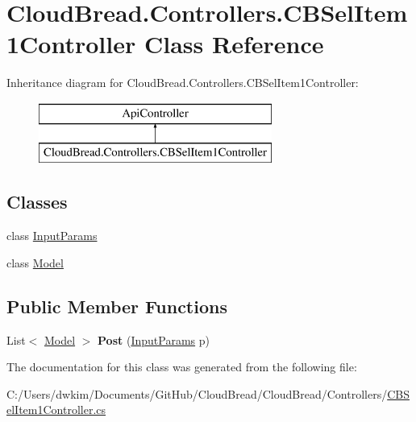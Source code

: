\hypertarget{a00048}{}\section{Cloud\+Bread.\+Controllers.\+C\+B\+Sel\+Item1\+Controller Class Reference}
\label{a00048}
Inheritance diagram for Cloud\+Bread.\+Controllers.\+C\+B\+Sel\+Item1\+Controller\+:\begin{figure}[H]
\begin{center}
\leavevmode
\includegraphics[height=2.000000cm]{a00048}
\end{center}
\end{figure}
\subsection*{Classes}
\begin{DoxyCompactItemize}
\item 
class \hyperlink{a00125}{Input\+Params}
\item 
class \hyperlink{a00157}{Model}
\end{DoxyCompactItemize}
\subsection*{Public Member Functions}
\begin{DoxyCompactItemize}
\item 
List$<$ \hyperlink{a00157}{Model} $>$ {\bfseries Post} (\hyperlink{a00125}{Input\+Params} p)\hypertarget{a00048_a4feb86ced862652ce4b266decb2ae692}{}\label{a00048_a4feb86ced862652ce4b266decb2ae692}

\end{DoxyCompactItemize}


The documentation for this class was generated from the following file\+:\begin{DoxyCompactItemize}
\item 
C\+:/\+Users/dwkim/\+Documents/\+Git\+Hub/\+Cloud\+Bread/\+Cloud\+Bread/\+Controllers/\hyperlink{a00219}{C\+B\+Sel\+Item1\+Controller.\+cs}\end{DoxyCompactItemize}
